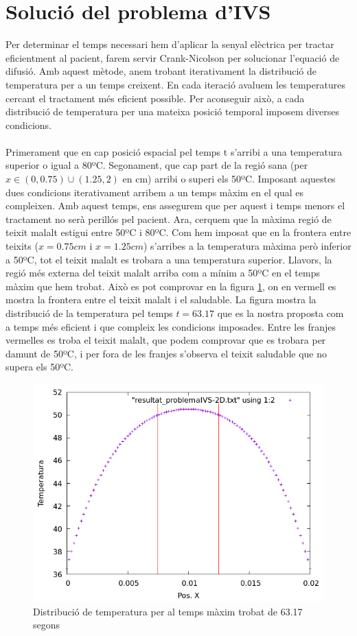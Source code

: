 \documentclass{article}
\begin{document}
\section{Solució del problema d'IVS}
Per determinar el temps necessari hem d'aplicar la senyal elèctrica per tractar eficientment al pacient, farem servir Crank-Nicolson per solucionar l'equació de difusió. Amb aquest mètode, anem trobant iterativament la distribució de temperatura per a un temps creixent. En cada iteració avaluem les temperatures cercant el tractament més eficient possible. Per aconseguir això, a cada distribució de temperatura per una mateixa posició temporal imposem diverses condicions.\\\\ Primerament que en cap posició espacial pel temps t s'arribi a una temperatura superior o igual a 80ºC. Segonament, que cap part de la regió sana (per $x\in(0,0.75) \cup (1.25,2)$ en cm) arribi o superi els 50ºC. Imposant aquestes dues condicions iterativament arribem a un temps màxim en el qual es compleixen. Amb aquest temps, ens assegurem que per aquest i temps menors el tractament no serà perillós pel pacient. Ara, cerquem que la màxima regió de teixit malalt estigui entre 50ºC i 80ºC. Com hem imposat que en la frontera entre teixits ($x =0.75cm$ i $x=1.25cm$) s'arribes a la temperatura màxima però inferior a 50ºC, tot el teixit malalt es trobara a una temperatura superior. Llavors, la regió més externa del teixit malalt arriba com a mínim a 50ºC en el temps màxim que hem trobat. Això es pot comprovar en la figura \ref{fig:solucion_ivs}, on en vermell es mostra la frontera entre el teixit malalt i el saludable. La figura mostra la distribució de la temperatura pel temps $t =  63.17$ que es la nostra proposta com a temps més eficient i que compleix les condicions imposades. Entre les franjes vermelles es troba el teixit malalt, que podem comprovar que es trobara per damunt de 50ºC, i per fora de les franjes s'observa el teixit saludable que no supera els 50ºC.

\begin{figure}[h]
    \centering
    \includegraphics[width=0.5\linewidth]{images/solucion_IVS-2D.png}
    \caption{Distribució de temperatura per al temps màxim trobat de 63.17 segons}
    \label{fig:solucion_ivs}
\end{figure}
\end{document}
